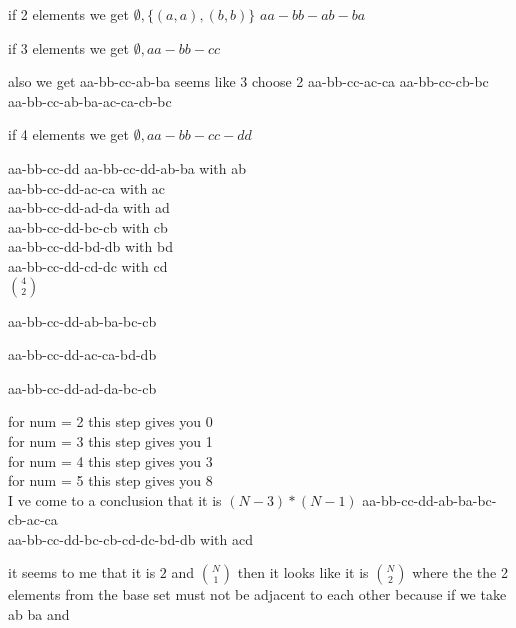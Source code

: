 \documentclass[12pts,A4]{article}
\begin{document}
\begin{flushleft}
    if 2 elements we get $ \emptyset , \{ (a,a),(b,b) \}$
                         $ aa-bb-ab-ba$

    if 3 elements we get $\emptyset, aa-bb-cc$

    also we get aa-bb-cc-ab-ba seems like 3 choose 2
                aa-bb-cc-ac-ca
                aa-bb-cc-cb-bc
                aa-bb-cc-ab-ba-ac-ca-cb-bc

    if 4 elements we get $\emptyset, aa-bb-cc-dd$

                aa-bb-cc-dd
                aa-bb-cc-dd-ab-ba with ab\\
                aa-bb-cc-dd-ac-ca with ac\\
                aa-bb-cc-dd-ad-da with ad\\
                aa-bb-cc-dd-bc-cb with cb\\
                aa-bb-cc-dd-bd-db with bd\\
                aa-bb-cc-dd-cd-dc with cd\\

                $\binom {4}{2}$

                aa-bb-cc-dd-ab-ba-bc-cb

                aa-bb-cc-dd-ac-ca-bd-db

                aa-bb-cc-dd-ad-da-bc-cb

                for num = 2 this step gives you 0\\
                for num = 3 this step gives you 1\\
                for num = 4 this step gives you 3\\
                for num = 5 this step gives you 8\\

                I ve come to a conclusion that it is $(N-3)*(N-1)$
                aa-bb-cc-dd-ab-ba-bc-cb-ac-ca \\
                aa-bb-cc-dd-bc-cb-cd-dc-bd-db with acd
   
   \bigskip
   it seems to me that it is $ 2 $ and $\binom {N} {1}$
   then it looks like it is $\binom {N}{2} $ where the the 2 elements from the base set must not be adjacent to each other 
    because if we take ab ba and 
    
\end{flushleft}
\end{document}
